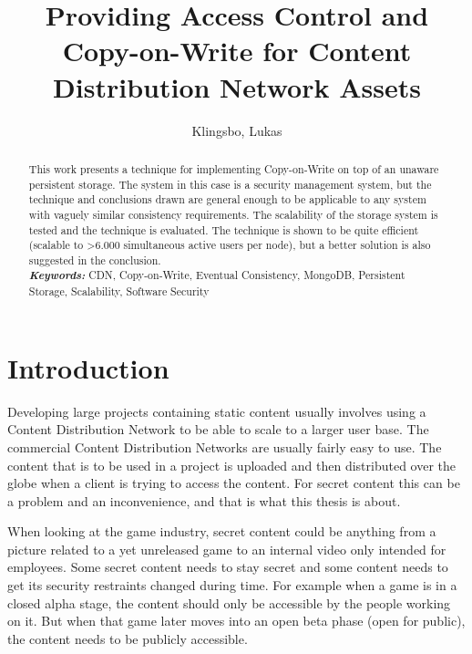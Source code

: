 \documentclass[a4paper,12pt]{article}
\title{\textbf{Providing Access Control and Copy-on-Write for Content Distribution Network Assets}}
\author{Klingsbo, Lukas}
\providecommand{\keywords}[1]{\textbf{\textit{Keywords: }} #1}
\begin{document}
\maketitle
%

\setcounter{page}{1}

%

\begin{abstract}
This work presents a technique for implementing Copy-on-Write on top of an unaware persistent
storage. The system in this case is a security management system, but the technique and conclusions
drawn are general enough to be applicable to any system with vaguely similar consistency
requirements. The scalability of the storage system is tested and the technique is evaluated. The
technique is shown to be quite efficient (scalable to >6.000 simultaneous active users per node),
but a better solution is also suggested in the conclusion.\\

\keywords{CDN, Copy-on-Write, Eventual Consistency, MongoDB, Persistent Storage, Scalability, 
Software Security}
\end{abstract}

\newpage\null\thispagestyle{empty}\newpage

\setcounter{tocdepth}{3}
\tableofcontents

\clearpage
{}
\setcounter{page}{1}

\section{Introduction}
Developing large projects containing static content usually involves using a Content Distribution
Network to be able to scale to a larger user base. The commercial Content Distribution Networks are
usually fairly easy to use. The content that is to be used in a project is uploaded and then
distributed over the globe when a client is trying to access the content. For secret content this
can be a problem and an inconvenience, and that is what this thesis is about. 

When looking at the game industry, secret content could be anything from a picture related to a yet
unreleased game to an internal video only intended for employees. Some secret content needs to stay
secret and some content needs to get its security restraints changed during time. For example when a
game is in a closed alpha stage, the content should only be accessible by the people working on it.
But when that game later moves into an open beta phase (open for public), the content needs to be
publicly accessible. 
\end{document}
